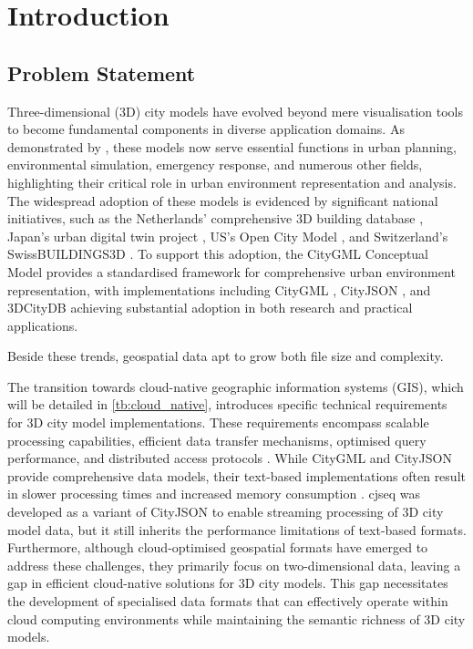 
\chapter{Introduction}%
\label{introduction}

\section{Problem Statement}
\label{introduction:problem_statement}
Three-dimensional (3D) city models have evolved beyond mere visualisation tools to become fundamental components in diverse application domains.
As demonstrated by \citet{biljecki_2015}, these models now serve essential functions in urban planning, environmental simulation, emergency response, and numerous other fields, highlighting their critical role in urban environment representation and analysis.
The widespread adoption of these models is evidenced by significant national initiatives, such as the Netherlands' comprehensive 3D building database \citep{3dbag}, Japan's urban digital twin project \citep{plateau}, US's Open City Model \citep{us_buildings3d}, and Switzerland's SwissBUILDINGS3D \citep{swiss_buildings3d}.
To support this adoption, the CityGML Conceptual Model \citep{CityGML} provides a standardised framework for comprehensive urban environment representation, with implementations including CityGML \citep{CityGML}, CityJSON \citep{cityjson}, and 3DCityDB \citep{3dcitydb} achieving substantial adoption in both research and practical applications.

Beside these trends, geospatial data apt to grow both file size and complexity.

The transition towards cloud-native geographic information systems (GIS), which will be detailed in \autoref{tb:cloud_native}, introduces specific technical requirements for 3D city model implementations.
These requirements encompass scalable processing capabilities, efficient data transfer mechanisms, optimised query performance, and distributed access protocols \citep{cloud-optimised-formats}.
While CityGML and CityJSON provide comprehensive data models, their text-based implementations often result in slower processing times and increased memory consumption \citep{jordi_van_liempt_2020}.  \ac{cjseq} was developed as a variant of CityJSON to enable streaming processing of 3D city model data, but it still inherits the performance limitations of text-based formats.
Furthermore, although cloud-optimised geospatial formats have emerged to address these challenges, they primarily focus on two-dimensional data, leaving a gap in efficient cloud-native solutions for 3D city models.
This gap necessitates the development of specialised data formats that can effectively operate within cloud computing environments while maintaining the semantic richness of 3D city models.

